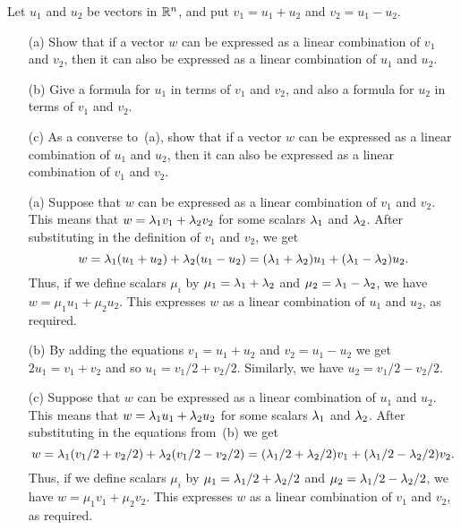 \documentclass[a4paper]{amsart}
\renewenvironment{solution}{\SolutionInline}{\endSolutionInline}
\begin{document}
\begin{exercise}\label{ex-combination-v}
 Let $u_1$ and $u_2$ be vectors in ${\mathbb{R}}^n$, and put $v_1=u_1+u_2$ and
 $v_2=u_1-u_2$.  
 \begin{itemize}
  \item[(a)] Show that if a vector $w$ can be expressed as a linear
   combination of $v_1$ and $v_2$, then it can also be expressed as a
   linear combination of $u_1$ and $u_2$.
  \item[(b)] Give a formula for $u_1$ in terms of $v_1$ and $v_2$, and
   also a formula for $u_2$ in terms of $v_1$ and $v_2$.
  \item[(c)] As a converse to~(a), show that if a vector $w$ can be
   expressed as a linear combination of $u_1$ and $u_2$, then it can
   also be expressed as a linear combination of $v_1$ and $v_2$.
 \end{itemize}
\end{exercise}
\begin{solution}
 \begin{itemize}
  \item[(a)] Suppose that $w$ can be expressed as a linear combination
   of $v_1$ and $v_2$.  This means that $w=\lambda_1v_1+\lambda_2v_2$ for some
   scalars $\lambda_1$ and $\lambda_2$.  After substituting in the definition
   of $v_1$ and $v_2$, we get 
   \[ w = \lambda_1(u_1+u_2) + \lambda_2(u_1-u_2) 
        = (\lambda_1+\lambda_2)u_1 + (\lambda_1-\lambda_2)u_2.
   \]
   Thus, if we define scalars $\mu_i$ by $\mu_1=\lambda_1+\lambda_2$ and
   $\mu_2=\lambda_1-\lambda_2$, we have $w=\mu_1u_1+\mu_2u_2$.  This expresses
   $w$ as a linear combination of $u_1$ and $u_2$, as required.
  \item[(b)] By adding the equations $v_1=u_1+u_2$ and $v_2=u_1-u_2$
   we get $2u_1=v_1+v_2$ and so $u_1=v_1/2+v_2/2$.  Similarly, we have
   $u_2=v_1/2-v_2/2$.
  \item[(c)] Suppose that $w$ can be expressed as a linear combination
   of $u_1$ and $u_2$.  This means that $w=\lambda_1u_1+\lambda_2u_2$ for some
   scalars $\lambda_1$ and $\lambda_2$.  After substituting in the equations
   from~(b) we get 
   \[ w = \lambda_1(v_1/2+v_2/2) + \lambda_2(v_1/2-v_2/2) 
        = (\lambda_1/2+\lambda_2/2)v_1 + (\lambda_1/2-\lambda_2/2)v_2.
   \]
   Thus, if we define scalars $\mu_i$ by $\mu_1=\lambda_1/2+\lambda_2/2$ and
   $\mu_2=\lambda_1/2-\lambda_2/2$, we have $w=\mu_1v_1+\mu_2v_2$.  This expresses
   $w$ as a linear combination of $v_1$ and $v_2$, as required.
 \end{itemize}
\end{solution}
\end{document}
